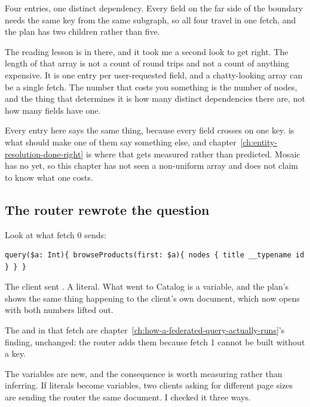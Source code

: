 Four entries, one distinct dependency. Every field on the far side of the
boundary needs the same key from the same subgraph, so all four travel in one
 fetch, and the plan has two children rather than five.

%
The reading lesson is in there, and it took me a second look to get right. The
length of that array is not a count of round trips and not a count of anything
expensive. It is one entry per user-requested field, and a chatty-looking array
can be a single fetch. The number that costs you something is the number of
 nodes, and the thing that determines it is how many distinct
dependencies there are, not how many fields have one.

Every entry here says the same thing, because every field crosses on one key.
 is what should make one of them say something else, and
chapter~\ref{ch:entity-resolution-done-right} is where that gets measured
rather than predicted. Mosaic has no  yet, so this chapter has
not seen a non-uniform  array and does not claim to know
what one costs.

\subsection*{The router rewrote the question}

%
Look at what fetch 0 sends:

\begin{verbatim}
query($a: Int){ browseProducts(first: $a){ nodes { title __typename id } } }
\end{verbatim}

The client sent . A literal. What went to Catalog is a variable,
and the plan's  shows the same thing happening to the
client's own document, which now opens  with
both numbers lifted out.

The  and  in that fetch are
chapter~\ref{ch:how-a-federated-query-actually-runs}'s finding, unchanged: the
router adds them because fetch 1 cannot be built without a key.

The variables are new, and the consequence is worth measuring rather than
inferring. If literals become variables, two clients asking for different page
sizes are sending the router the same document. I checked it three ways.

